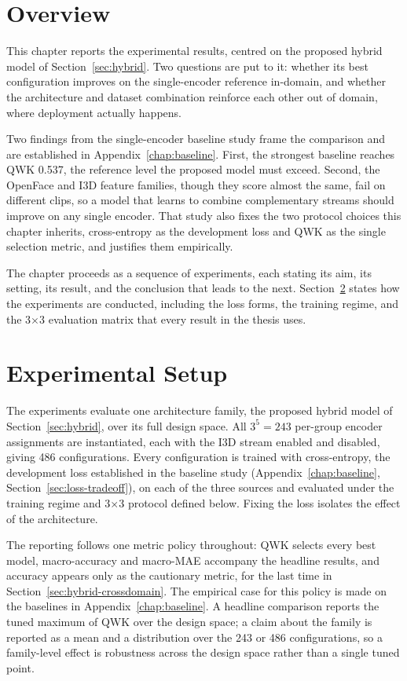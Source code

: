 \documentclass[../main.tex]{subfiles}
\begin{document}
\FloatBarrier
\section{Overview}
\label{sec:hybrid-overview}

This chapter reports the experimental results, centred on the proposed hybrid model of Section~\ref{sec:hybrid}. Two questions are put to it: whether its best configuration improves on the single-encoder reference in-domain, and whether the architecture and dataset combination reinforce each other out of domain, where deployment actually happens.

Two findings from the single-encoder baseline study frame the comparison and are established in Appendix~\ref{chap:baseline}. First, the strongest baseline reaches QWK 0.537, the reference level the proposed model must exceed. Second, the OpenFace and I3D feature families, though they score almost the same, fail on different clips, so a model that learns to combine complementary streams should improve on any single encoder. That study also fixes the two protocol choices this chapter inherits, cross-entropy as the development loss and QWK as the single selection metric, and justifies them empirically.

The chapter proceeds as a sequence of experiments, each stating its aim, its setting, its result, and the conclusion that leads to the next. Section~\ref{sec:setup-hybrid} states how the experiments are conducted, including the loss forms, the training regime, and the 3$\times$3 evaluation matrix that every result in the thesis uses.

\FloatBarrier
\section{Experimental Setup}
\label{sec:setup-hybrid}

The experiments evaluate one architecture family, the proposed hybrid model of Section~\ref{sec:hybrid}, over its full design space. All $3^{5}=243$ per-group encoder assignments are instantiated, each with the I3D stream enabled and disabled, giving 486 configurations. Every configuration is trained with cross-entropy, the development loss established in the baseline study (Appendix~\ref{chap:baseline}, Section~\ref{sec:loss-tradeoff}), on each of the three sources and evaluated under the training regime and 3$\times$3 protocol defined below. Fixing the loss isolates the effect of the architecture.

The reporting follows one metric policy throughout: QWK selects every best model, macro-accuracy and macro-MAE accompany the headline results, and accuracy appears only as the cautionary metric, for the last time in Section~\ref{sec:hybrid-crossdomain}. The empirical case for this policy is made on the baselines in Appendix~\ref{chap:baseline}. A headline comparison reports the tuned maximum of QWK over the design space; a claim about the family is reported as a mean and a distribution over the 243 or 486 configurations, so a family-level effect is robustness across the design space rather than a single tuned point.
\end{document}
